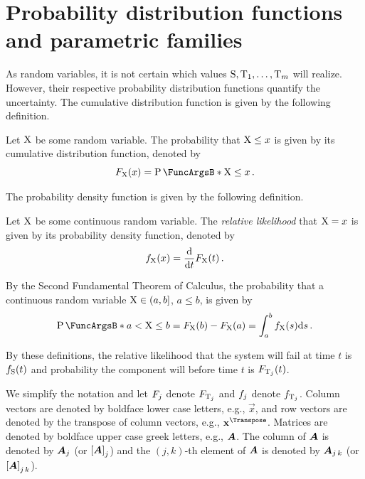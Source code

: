 \documentclass[
    11pt,
    extrafontsizes,
    article,
    oldfontcommands,
    final,
    oneside,
    openany,
    hidelinks]{memoir}
\begin{document}
\section{Probability distribution functions and parametric families}
As random variables, it is not certain which values $\mathrm{S},\mathrm{T}_1,\ldots,\mathrm{T}_m$ 
will realize. However, their respective probability distribution functions 
quantify the uncertainty. The cumulative distribution function is given by the 
following definition.
\begin{definition}
    \label{def:cdf_function}
    Let $\mathrm{X}$ be some random variable. The probability that $\mathrm{X} \leq x$ 
    is given by its cumulative distribution function, denoted by
    \begin{equation}
    \cdf_{\RV{X}}\!\left(x\right) = \Prob{\RV{X} \leq x}\,.
    \end{equation}
\end{definition}
The probability density function is given by the following definition.
\begin{definition}
    \label{def:pdf}
    Let $\mathrm{X}$ be some continuous random variable. The \emph{relative 
        likelihood} that $\mathrm{X} = x$ is given by its probability density 
    function, denoted by
    \begin{equation}
    f_{\mathrm{X}}(x) = \frac {\mathrm{d}}{\mathrm{d}t}F_{\mathrm{X}}(t)\,.
    \end{equation}
\end{definition}
By the Second Fundamental Theorem of Calculus, the probability that a 
continuous random variable $\mathrm{X} \in \left(a,b\right]$, $a \leq b$, is given 
by
\begin{equation}
\label{eq:prob_F_R_p}
\Prob{a < \RV{X} \leq b} = \cdf_{\RV{X}}(b) - \cdf_{\RV{X}}(a) = \int_{a}^{b} 
\pdf_{\RV{X}}(s) \mathrm{d}s\,.
\end{equation}

By these definitions, the relative likelihood that the system will fail at time 
$t$ is $f_{\mathrm{S}}(t)$ and probability the \jth component will before time $t$ is 
$F_{\mathrm{T}_j}(t)$.
\begin{notation}
We simplify the notation and let $F_j$ denote $F_{\mathrm{T}_j}$ and $f_j$ denote $f_{\mathrm{T}_j}$.
Column vectors are denoted by boldface lower case letters, e.g., $\vec{x}$, and row vectors are denoted by the transpose of column vectors, e.g., $\vec{x}^\Transpose$.
Matrices are denoted by boldface upper case greek letters, e.g., $\boldsymbol{A}$.
The \jth column of $\boldsymbol{A}$ is denoted by $\boldsymbol{A}_j$ (or $\left[\boldsymbol{A}\right]_j$) and the $(j,k)$-th element of $\boldsymbol{A}$ is denoted by $\boldsymbol{A}_{j\,k}$ (or $\left[\boldsymbol{A}\right]_{j\,k}$).
\end{notation}
\end{document}
